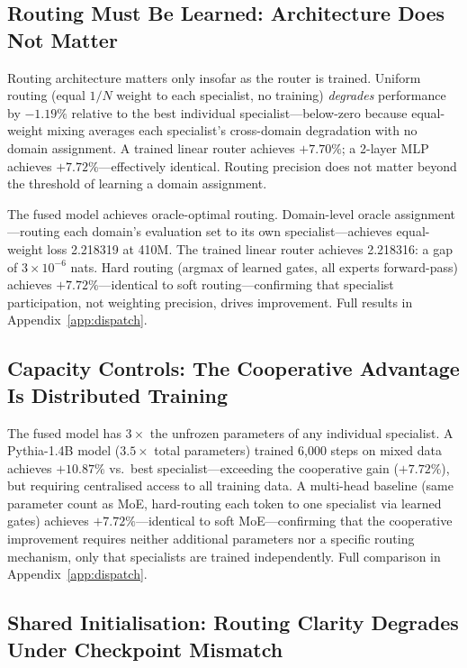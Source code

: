 \documentclass{article}
\begin{document}
\subsection{Routing Must Be Learned: Architecture Does Not Matter}
\label{sec:failure}

Routing architecture matters only insofar as the router is trained. Uniform routing (equal $1/N$ weight to each specialist, no training) \emph{degrades} performance by $-1.19\%$ relative to the best individual specialist---below-zero because equal-weight mixing averages each specialist's cross-domain degradation with no domain assignment. A trained linear router achieves $+7.70\%$; a 2-layer MLP achieves $+7.72\%$---effectively identical. Routing precision does not matter beyond the threshold of learning a domain assignment.

The fused model achieves oracle-optimal routing. Domain-level oracle assignment---routing each domain's evaluation set to its own specialist---achieves equal-weight loss 2.218319 at 410M. The trained linear router achieves 2.218316: a gap of $3 \times 10^{-6}$ nats. Hard routing (argmax of learned gates, all experts forward-pass) achieves $+7.72\%$---identical to soft routing---confirming that specialist participation, not weighting precision, drives improvement. Full results in Appendix~\ref{app:dispatch}.

\subsection{Capacity Controls: The Cooperative Advantage Is Distributed Training}
\label{sec:capacity}

The fused model has $3\times$ the unfrozen parameters of any individual specialist. A Pythia-1.4B model ($3.5\times$ total parameters) trained 6,000 steps on mixed data achieves $+10.87\%$ vs.\ best specialist---exceeding the cooperative gain ($+7.72\%$), but requiring centralised access to all training data. A multi-head baseline (same parameter count as MoE, hard-routing each token to one specialist via learned gates) achieves $+7.72\%$---identical to soft MoE---confirming that the cooperative improvement requires neither additional parameters nor a specific routing mechanism, only that specialists are trained independently. Full comparison in Appendix~\ref{app:dispatch}.

\subsection{Shared Initialisation: Routing Clarity Degrades Under Checkpoint Mismatch}
\label{sec:sharedinit}
\end{document}
